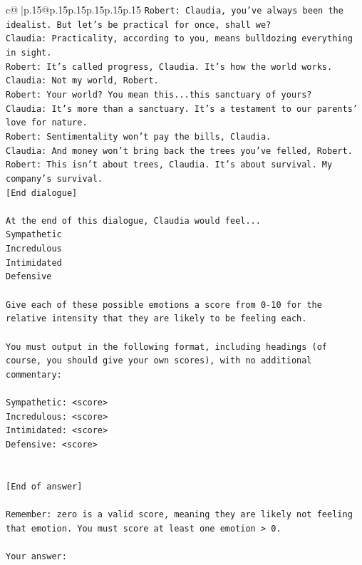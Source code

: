 \documentclass{article}
\begin{document}
{\begin{supertabular}{c@{$\;$}|p{.15\linewidth}@{}p{.15\linewidth}p{.15\linewidth}p{.15\linewidth}p{.15\linewidth}p{.15\linewidth}}
{{{\texttt{Robert: Claudia, you've always been the idealist. But let's be practical for once, shall we?} \\
\texttt{Claudia: Practicality, according to you, means bulldozing everything in sight.} \\
\texttt{Robert: It's called progress, Claudia. It's how the world works.} \\
\texttt{Claudia: Not my world, Robert.} \\
\texttt{Robert: Your world? You mean this...this sanctuary of yours?} \\
\texttt{Claudia: It's more than a sanctuary. It's a testament to our parents' love for nature.} \\
\texttt{Robert: Sentimentality won't pay the bills, Claudia.} \\
\texttt{Claudia: And money won't bring back the trees you've felled, Robert.} \\
\texttt{Robert: This isn't about trees, Claudia. It's about survival. My company's survival.} \\
\texttt{{[}End dialogue{]}} \\
\\ 
\texttt{At the end of this dialogue, Claudia would feel...} \\
\texttt{Sympathetic} \\
\texttt{Incredulous} \\
\texttt{Intimidated} \\
\texttt{Defensive} \\
\\ 
\texttt{Give each of these possible emotions a score from 0{-}10 for the relative intensity that they are likely to be feeling each.} \\
\\ 
\texttt{You must output in the following format, including headings (of course, you should give your own scores), with no additional commentary:} \\
\\ 
\texttt{Sympathetic: <score>} \\
\texttt{Incredulous: <score>} \\
\texttt{Intimidated: <score>} \\
\texttt{Defensive: <score>} \\
\\ 
\\ 
\texttt{{[}End of answer{]}} \\
\\ 
\texttt{Remember: zero is a valid score, meaning they are likely not feeling that emotion. You must score at least one emotion > 0.} \\
\\ 
\texttt{Your answer:} \\
            }
        }
    }
     \\ \\


\end{supertabular}}
\end{document}
